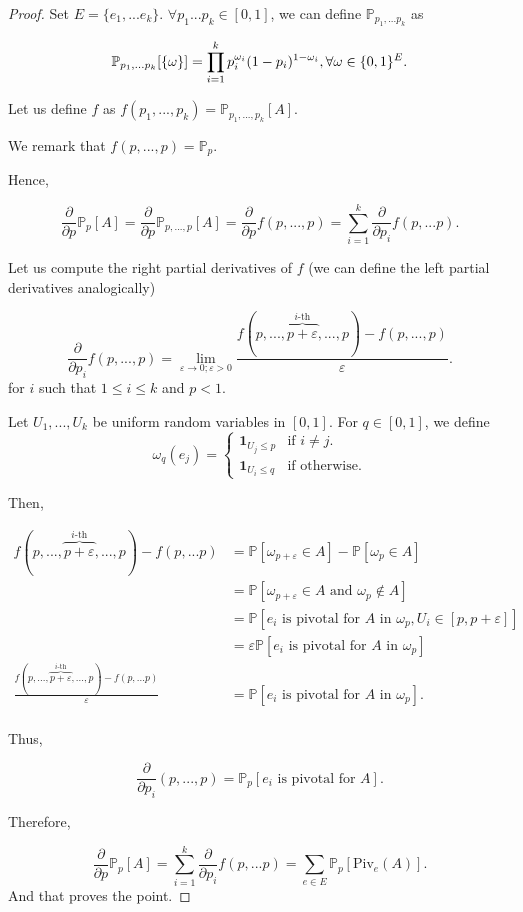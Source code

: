 \documentclass[a4paper,11pt]{article}
\theoremstyle{plain}
\theoremstyle{definition}
\theoremstyle{remark}
\begin{document}
\begin{proof}
Set $E = \{ e_1, ... e_k \}$.
$\forall p_1 ... p_k \in [0,1]$, we can define $\mathbb{P}_{p_1, ... p_k}$ as

\[ \mathbb{P}_{p_1, ... p_k}[\{\omega\}] = \prod_{i = 1}^{k}{p_{i}^{\omega_i} (1 - p_{i})^{1 - \omega_i}}, \space\forall \omega \in \{ 0,1 \}^E. \]

Let us define $f$ as $f(p_1, ..., p_k) = \mathbb{P}_{p_1, ..., p_k}[A]$.

We remark that $f(p, ..., p) = \mathbb{P}_{p}$.

Hence,

\[ \frac{\partial}{\partial p} \mathbb{P}_{p}[A] = \frac{\partial}{\partial p} \mathbb{P}_{p, ... ,p}[A] = \frac{\partial}{\partial p} f(p, ..., p) = \sum_{i = 1}^{k}{\frac{\partial}{\partial p_i}f(p, ... p)}. \]

Let us compute the right partial derivatives of $f$ (we can define the left partial derivatives analogically)

\[ \frac{\partial}
{\partial p_i}f(p, ..., p) = \lim_{\varepsilon \rightarrow 0 ; \varepsilon > 0}{\frac{f(p,...,\overbrace{p+\varepsilon}^{i\text{-th}},...,p) - f(p,...,p)}{\varepsilon}}. \]
for $i$ such that $1 \leq i \leq k$ and $p < 1$.

Let $U_1, ..., U_k$ be uniform random variables in $[0,1]$. For $q \in [0, 1]$, we define
\[
\omega_q(e_j) = \left\{
    \begin{array}{ll}
        \mathbf{1}_{U_j \leq p} & \text{if } i \not= j.\\
        \mathbf{1}_{U_i \leq q} & \text{if otherwise.}
    \end{array}
\right.
\]

Then,

\begin{align*}
f(p, ..., \overbrace{p+\varepsilon}^{i\text{-th}}, ..., p) - f(p, ... p) &= \mathbb{P}[\omega_{p + \varepsilon} \in A] - \mathbb{P}[\omega_{p} \in A] \\
&= \mathbb{P}[\omega_{p + \varepsilon} \in A \text{ and } \omega_{p} \not\in A] \\
&= \mathbb{P}[e_i \text{ is pivotal for } A \text{ in } \omega_p, U_i \in [p, p + \varepsilon]] \\
&= \varepsilon \mathbb{P}[e_i \text{ is pivotal for } A \text{ in } \omega_p] \\
\frac{f(p, ...,\overbrace{p+\varepsilon}^{i\text{-th}}, ..., p) - f(p, ... p)}{\varepsilon} &=\mathbb{P}[e_i \text{ is pivotal for } A \text{ in } \omega_p]. \\
\end{align*}

Thus,

\[ \frac{\partial}{\partial p_i}(p, ..., p) = \mathbb{P}_p[e_i \text{ is pivotal for } A].\]

Therefore,

\[ \frac{\partial}{\partial p} \mathbb{P}_{p}[A] = \sum_{i = 1}^{k}{\frac{\partial}{\partial p_i}f(p, ... p)} = \sum_{e \in E}{\mathbb{P}_p[\mathrm{Piv}_e(A)]}.\]
And that proves the point.
\end{proof}
\end{document}
